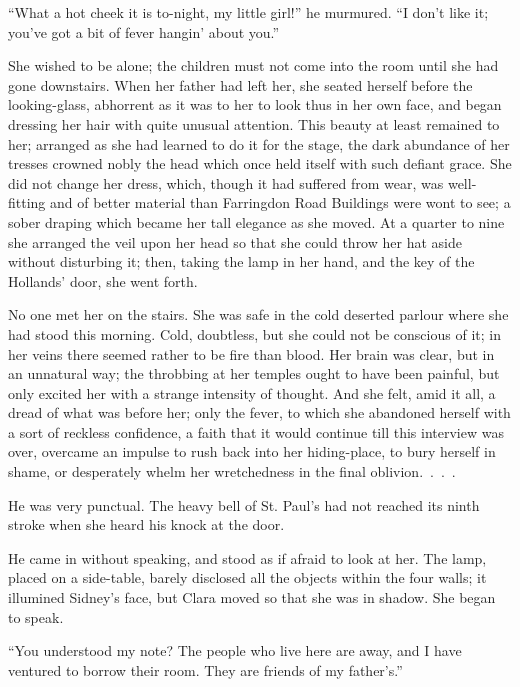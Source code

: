 ``What a hot cheek it is to-night, my little girl!'' he murmured. ``I
don't like it; you've got a bit of fever hangin' about you.''

She wished to be alone; the children must not come into the room until
she had gone downstairs. When her father had left her, she seated
herself before the looking-glass, abhorrent as it was to her to look
thus in her own face, and began dressing her hair with
{\protect\hypertarget{77}{}{}}quite unusual attention. This beauty at
least remained to her; arranged as she had learned to do it for the
stage, the dark abundance of her tresses crowned nobly the head which
once held itself with such defiant grace. She did not change her dress,
which, though it had suffered from wear, was well-fitting and of better
material than Farringdon Road Buildings were wont to see; a sober
draping which became her tall elegance as she moved. At a quarter to
nine she arranged the veil upon her head so that she could throw her hat
aside without disturbing it; then, taking the lamp in her hand, and the
key of the Hollands' door, she went forth.

No one met her on the stairs. She was safe in the cold deserted parlour
where she had stood this morning. Cold, doubtless, but she could not be
conscious of it; in her veins there seemed rather to be fire than blood.
Her brain was clear, but in an unnatural way; the throbbing at her
temples ought to have been painful, but only excited her with a strange
intensity of thought. And she felt, amid it all, a dread of what was
before her; only the fever, to which she abandoned herself with a
{\protect\hypertarget{78}{}{}}sort of reckless confidence, a faith that
it would continue till this interview was over, overcame an impulse to
rush back into her hiding-place, to bury herself in shame, or
desperately whelm her wretchedness in the final {oblivion{.~.~.~.}}

He was very punctual. The heavy bell of St. Paul's had not reached its
ninth stroke when she heard his knock at the door.

He came in without speaking, and stood as if afraid to look at her. The
lamp, placed on a side-table, barely disclosed all the objects within
the four walls; it illumined Sidney's face, but Clara moved so that she
was in shadow. She began to speak.

``You understood my note? The people who live here are away, and I have
ventured to borrow their room. They are friends of my father's.''

